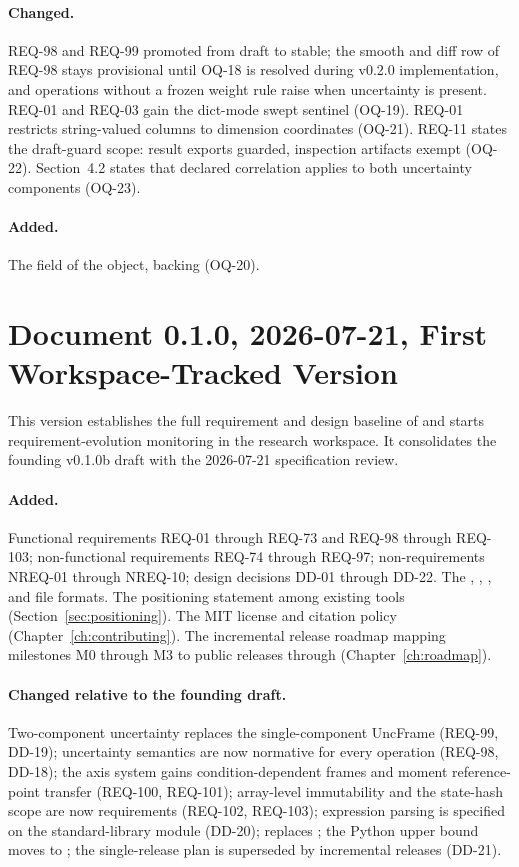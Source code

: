\paragraph{Changed.} REQ-98 and REQ-99 promoted from draft to stable;
the smooth and diff row of REQ-98 stays provisional until OQ-18 is
resolved during v0.2.0 implementation, and operations without a frozen
weight rule raise when uncertainty is present. REQ-01 and REQ-03 gain
the dict-mode  swept sentinel (OQ-19). REQ-01 restricts
string-valued columns to dimension coordinates (OQ-21). REQ-11 states
the draft-guard scope: result exports guarded, inspection artifacts
exempt (OQ-22). Section~4.2 states that declared correlation applies
to both uncertainty components (OQ-23).

\paragraph{Added.} The  field of the
 object, backing  (OQ-20).

\section*{Document 0.1.0, 2026-07-21, First Workspace-Tracked Version}

This version establishes the full requirement and design baseline of
\itc{} and starts requirement-evolution monitoring in the research
workspace. It consolidates the founding v0.1.0b draft with the 2026-07-21
specification review.

\paragraph{Added.} Functional requirements REQ-01 through REQ-73 and
REQ-98 through REQ-103; non-functional requirements REQ-74 through REQ-97;
non-requirements NREQ-01 through NREQ-10; design decisions DD-01 through
DD-22. The , , , and
 file formats. The positioning statement among existing
tools (Section~\ref{sec:positioning}). The MIT license and citation policy
(Chapter~\ref{ch:contributing}). The incremental release roadmap mapping
milestones M0 through M3 to public releases  through
 (Chapter~\ref{ch:roadmap}).

\paragraph{Changed relative to the founding draft.} Two-component
uncertainty replaces the single-component UncFrame (REQ-99, DD-19);
uncertainty semantics are now normative for every operation (REQ-98,
DD-18); the axis system gains condition-dependent frames and moment
reference-point transfer (REQ-100, REQ-101); array-level immutability and
the state-hash scope are now requirements (REQ-102, REQ-103); expression
parsing is specified on the standard-library  module (DD-20);
 replaces ; the Python upper bound moves to
; the single-release plan is superseded by incremental
releases (DD-21).
